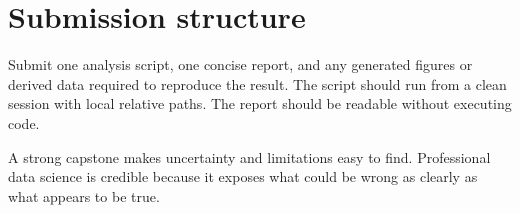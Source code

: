 \section{Submission structure}
Submit one analysis script, one concise report, and any generated figures or derived data required to reproduce the result. The script should run from a clean session with local relative paths. The report should be readable without executing code.

\begin{keyidea}
A strong capstone makes uncertainty and limitations easy to find. Professional data science is credible because it exposes what could be wrong as clearly as what appears to be true.
\end{keyidea}
